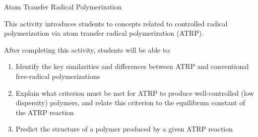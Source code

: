 %
%
%
%

\renewcommand{\figpath}{content/polymchem/livingpolyms/ATRP/figs}
\renewcommand{\labelbase}{ATRP}

\begin{activity}{Atom Transfer Radical Polymerization}

\begin{instructornotes}
	This activity introduces students to concepts related to controlled radical polymerization via atom transfer radical polymerization (ATRP).
	
	After completing this activity, students will be able to:
	\begin{enumerate}
		\item Identify the key similarities and differences between ATRP and conventional free-radical polymerizations		
		\item Explain what criterion must be met for ATRP to produce well-controlled (low dispersity) polymers, and relate this criterion to the equilibrum constant of the ATRP reaction
		\item Predict the structure of a polymer produced by a given ATRP reaction
	\end{enumerate}
	

\end{instructornotes}
\end{activity}
